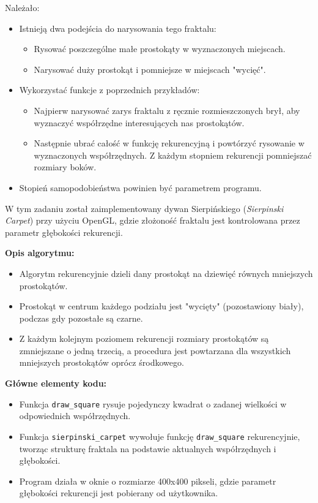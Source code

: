 \documentclass[a4paper, 12pt]{article}
\begin{document}
Należało:
\begin{itemize}
    \item Istnieją dwa podejścia do narysowania tego fraktalu:
    \begin{itemize}
        \item Rysować poszczególne małe prostokąty w wyznaczonych miejscach.
        \item Narysować duży prostokąt i pomniejsze w miejscach "wycięć".
    \end{itemize}
    \item Wykorzystać funkcje z poprzednich przykładów:
    \begin{itemize}
        \item Najpierw narysować zarys fraktalu z ręcznie rozmieszczonych brył, aby wyznaczyć współrzędne interesujących nas prostokątów.
        \item Następnie ubrać całość w funkcję rekurencyjną i powtórzyć rysowanie w wyznaczonych współrzędnych. Z każdym stopniem rekurencji pomniejszać rozmiary boków.
    \end{itemize}
    \item Stopień samopodobieństwa powinien być parametrem programu.
\end{itemize}

W tym zadaniu został zaimplementowany dywan Sierpińskiego (\textit{Sierpinski Carpet}) przy użyciu OpenGL, gdzie złożoność fraktalu jest kontrolowana przez parametr głębokości rekurencji.

\textbf{Opis algorytmu:}

\begin{itemize}
    \item Algorytm rekurencyjnie dzieli dany prostokąt na dziewięć równych mniejszych prostokątów.
    \item Prostokąt w centrum każdego podziału jest "wycięty" (pozostawiony biały), podczas gdy pozostałe są czarne.
    \item Z każdym kolejnym poziomem rekurencji rozmiary prostokątów są zmniejszane o jedną trzecią, a procedura jest powtarzana dla wszystkich mniejszych prostokątów oprócz środkowego.
\end{itemize}

\textbf{Główne elementy kodu:}

\begin{itemize}
    \item Funkcja \texttt{draw\_square} rysuje pojedynczy kwadrat o zadanej wielkości w odpowiednich współrzędnych.
    \item Funkcja \texttt{sierpinski\_carpet} wywołuje funkcję \texttt{draw\_square} rekurencyjnie, tworząc strukturę fraktala na podstawie aktualnych współrzędnych i głębokości.
    \item Program działa w oknie o rozmiarze 400x400 pikseli, gdzie parametr głębokości rekurencji jest pobierany od użytkownika.
\end{itemize}
\end{document}
